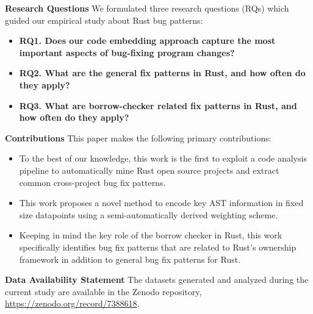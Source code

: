 \noindent \textbf{Research Questions} We formulated three research questions (RQs) which guided our empirical study about Rust bug patterns:

\begin{itemize}
    \item \textbf{RQ1. Does our code embedding approach capture the most important aspects of bug-fixing program changes?} 
    \item \textbf{RQ2. What are the general fix patterns in Rust, and how often do they apply?} 
    \item \textbf{RQ3. What are borrow-checker related fix patterns in Rust, and how often do they apply?}
\end{itemize}

\noindent \textbf{Contributions} This paper makes the following primary contributions:

\begin{itemize}
    \item To the best of our knowledge, this work is the first to exploit a code analysis pipeline to automatically mine Rust open source projects and extract common cross-project bug fix patterns.
    \item This work proposes a novel method to encode key AST information in fixed size datapoints using a semi-automatically derived weighting scheme.
    \item Keeping in mind the key role of the borrow checker in Rust, this work specifically identifies bug fix patterns that are related to Rust's ownership framework in addition to general bug fix patterns for Rust.
\end{itemize}


\noindent \textbf{Data Availability Statement} The datasets generated and analyzed during the current study are available in the Zenodo repository, \url{https://zenodo.org/record/7388618}.
